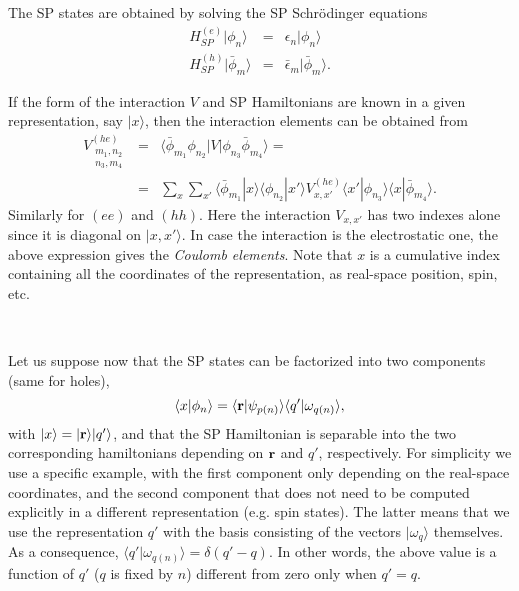 \documentclass[12pt,twoside]{article}
\begin{document}
The SP states are obtained by solving the SP Schr\"odinger equations
\begin{eqnarray}
H_{SP}^{(e)} |\phi_n\rangle &=& \epsilon_n |\phi_n\rangle \\
H_{SP}^{(h)} |\bar\phi_m\rangle &=& \bar\epsilon_m |\bar\phi_m\rangle.
\end{eqnarray}

If the form of the interaction $V$ and SP Hamiltonians are known in a
given representation, say $|x\rangle$,
then the interaction elements can be obtained from
\begin{eqnarray}
V_{\substack{m_1,n_2\\n_3,m_4}}^{(he)}&=&
\langle\bar\phi_{m_1} \phi_{n_2}| V |\phi_{n_3} \bar\phi_{m_4}\rangle =
\\
&=&\sum_x \sum_{x'} \langle\bar\phi_{m_1}|x\rangle \langle\phi_{n_2}|x'\rangle
V_{x,x'}^{(he)} \langle x'|\phi_{n_3}\rangle \langle x|\bar\phi_{m_4}\rangle .
\end{eqnarray}
Similarly for $(ee)$ and $(hh)$.  Here the interaction $V_{x,x'}$ has
two indexes alone since it is diagonal on $|x,x'\rangle$.  In case the
interaction is the electrostatic one, the above expression gives the
\emph{Coulomb elements}. Note that $x$ is a cumulative
index containing all the coordinates of the representation, as
real-space position, spin, etc.

\

Let us suppose now that the SP states can be factorized into two
components (same for holes),
\begin{equation} \label{eq:phifactorize}
\langle x|\phi_n\rangle=\langle{\bf r}|\psi_{p(n)}\rangle
\langle q'|\omega_{q(n)}\rangle ,
\end{equation}
with $|x\rangle=|{\bf r}\rangle |q'\rangle$, and that the SP
Hamiltonian is separable into the two corresponding hamiltonians
depending on ${\bf r}$ and $q'$, respectively.  For simplicity we use
a specific example, with the first component only depending on the
real-space coordinates, and the second component that does not need to
be computed explicitly in a different representation (e.g. spin
states). The latter means that we use the representation $q'$ with the
basis consisting of the vectors $|\omega_{q}\rangle$ themselves.  As a
consequence, $\langle q'|\omega_{q(n)}\rangle = \delta(q'-q)$. In
other words, the above value is a function of $q'$ ($q$ is fixed by
$n$) different from zero only when $q'=q$.
\end{document}
